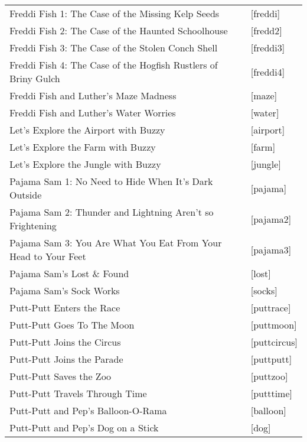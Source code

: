 \begin{itemize}
\begin{tabular}[h]{ll}
    Freddi Fish 1: The Case of the Missing Kelp Seeds&             [freddi]\\
    Freddi Fish 2: The Case of the Haunted Schoolhouse&            [fredd2]\\
    Freddi Fish 3: The Case of the Stolen Conch Shell&             [freddi3]\\
    Freddi Fish 4: The Case of the Hogfish Rustlers of Briny Gulch&[freddi4]\\
    Freddi Fish and Luther's Maze Madness&                         [maze]\\
    Freddi Fish and Luther's Water Worries&                        [water]\\
    Let's Explore the Airport with Buzzy&                          [airport]\\
    Let's Explore the Farm with Buzzy&                             [farm]\\
    Let's Explore the Jungle with Buzzy&                           [jungle]\\
    Pajama Sam 1: No Need to Hide When It's Dark Outside&          [pajama]\\
    Pajama Sam 2: Thunder and Lightning Aren't so Frightening&     [pajama2]\\
    Pajama Sam 3: You Are What You Eat From Your Head to Your Feet&[pajama3]\\
    Pajama Sam's Lost \& Found&                                    [lost]\\
    Pajama Sam's Sock Works&                                       [socks]\\
    Putt-Putt Enters the Race&                                     [puttrace]\\
    Putt-Putt Goes To The Moon&                                    [puttmoon]\\
    Putt-Putt Joins the Circus&                                    [puttcircus]\\
    Putt-Putt Joins the Parade&                                    [puttputt]\\
    Putt-Putt Saves the Zoo&                                       [puttzoo]\\
    Putt-Putt Travels Through Time&                                [putttime]\\
    Putt-Putt and Pep's Balloon-O-Rama&                            [balloon]\\
    Putt-Putt and Pep's Dog on a Stick&                            [dog]\\

\end{tabular}
\end{itemize}
